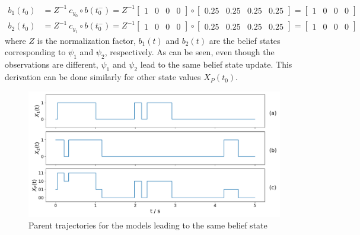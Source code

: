 \begin{align}
b_1(t_0) &= Z^{-1}\ c_{y_0} \circ b(t_0^-) = Z^{-1} \begin{bmatrix}
1 & 0 & 0 & 0\end{bmatrix} \circ \begin{bmatrix}
0.25 & 0.25 & 0.25 & 0.25 \end{bmatrix} = \begin{bmatrix}
1 & 0 & 0 & 0\end{bmatrix} \\
b_2(t_0) &= Z^{-1}\ c_{y_1} \circ b(t_0^-) = Z^{-1} \begin{bmatrix}
1 & 0 & 0 & 0\end{bmatrix} \circ \begin{bmatrix}
0.25 & 0.25 & 0.25 & 0.25 \end{bmatrix} = \begin{bmatrix}
1 & 0 & 0 & 0\end{bmatrix}
\end{align}
where $ Z $ is the normalization factor, $ b_1(t) $ and $ b_2(t) $ are the belief states corresponding to $ \psi_1 $ and $ \psi_2 $, respectively. As can be seen, even though the observations are different, $ \psi_1 $ and $ \psi_2 $ lead to the same belief state update. This derivation can be done similarly for other state values $ X_P(t_0) $.
\begin{figure}[H]
	\begin{center}
		\includegraphics[width=.90\textwidth]{figures/equivalence_classes/same_belief/parent_traj}
		\caption[Parent trajectories for the models leading to the same belief state]{Parent trajectories for the models leading to the same belief state}
		\label{fig:same_belief_parents}
	\end{center}
\end{figure}
